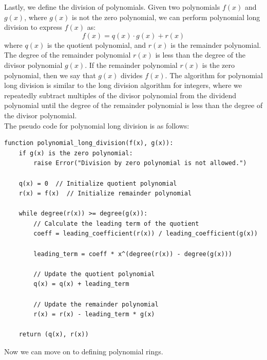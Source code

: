 \documentclass[openany]{book}
\begin{document}
Lastly, we define the division of polynomials. Given two polynomials $f(x)$ and $g(x)$, where $g(x)$ is not the zero polynomial, we can perform polynomial long division to express $f(x)$ as:
\[f(x) = q(x) \cdot g(x) + r(x)\]
where $q(x)$ is the quotient polynomial, and $r(x)$ is the remainder polynomial. The degree of the remainder polynomial $r(x)$ is less than the degree of the divisor polynomial $g(x)$. If the remainder polynomial $r(x)$ is the zero polynomial, then we say that $g(x)$ divides $f(x)$.
The algorithm for polynomial long division is similar to the long division algorithm for integers, where we repeatedly subtract multiples of the divisor polynomial from the dividend polynomial until the degree of the remainder polynomial is less than the degree of the divisor polynomial. \\
The pseudo code for polynomial long division is as follows:
\begin{verbatim}
function polynomial_long_division(f(x), g(x)):
    if g(x) is the zero polynomial:
        raise Error("Division by zero polynomial is not allowed.")
    
    q(x) = 0  // Initialize quotient polynomial
    r(x) = f(x)  // Initialize remainder polynomial
    
    while degree(r(x)) >= degree(g(x)):
        // Calculate the leading term of the quotient
        coeff = leading_coefficient(r(x)) / leading_coefficient(g(x))
        
        leading_term = coeff * x^(degree(r(x)) - degree(g(x)))
        
        // Update the quotient polynomial
        q(x) = q(x) + leading_term
        
        // Update the remainder polynomial
        r(x) = r(x) - leading_term * g(x)
    
    return (q(x), r(x))
\end{verbatim}
Now we can move on to defining polynomial rings.
\end{document}
